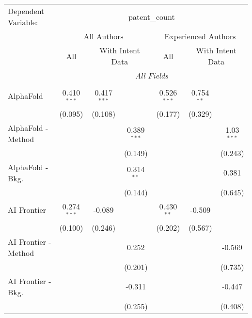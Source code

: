 \begingroup
\centering
\begin{tabular}{lcccccc}
   \tabularnewline \midrule \midrule
   Dependent Variable: & \multicolumn{6}{c}{patent\_count}\\
 & \multicolumn{3}{c}{All Authors} & \multicolumn{3}{c}{Experienced Authors} \\
\cmidrule(lr){2-4} \cmidrule(lr){5-7}
 & \multicolumn{1}{c}{All} & \multicolumn{2}{c}{With Intent Data} & \multicolumn{1}{c}{All} & \multicolumn{2}{c}{With Intent Data} \\
\cmidrule(lr){2-2} \cmidrule(lr){3-4} \cmidrule(lr){5-5} \cmidrule(lr){6-7}
 & \multicolumn{6}{c}{\textit{All Fields}} \\ \\
   AlphaFold            & 0.410$^{***}$ & 0.417$^{***}$ &               & 0.526$^{***}$ & 0.754$^{**}$ &   \\   
                        & (0.095)       & (0.108)       &               & (0.177)       & (0.329)      &   \\   
   AlphaFold - Method   &               &               & 0.389$^{***}$ &               &              & 1.03$^{***}$\\   
                        &               &               & (0.149)       &               &              & (0.243)\\   
   AlphaFold - Bkg.     &               &               & 0.314$^{**}$  &               &              & 0.381\\   
                        &               &               & (0.144)       &               &              & (0.645)\\   
   AI Frontier          & 0.274$^{***}$ & -0.089        &               & 0.430$^{**}$  & -0.509       &   \\   
                        & (0.100)       & (0.246)       &               & (0.202)       & (0.567)      &   \\   
   AI Frontier - Method &               &               & 0.252         &               &              & -0.569\\   
                        &               &               & (0.201)       &               &              & (0.735)\\   
   AI Frontier - Bkg.   &               &               & -0.311        &               &              & -0.447\\   
                        &               &               & (0.255)       &               &              & (0.408)\\   

\end{tabular}
